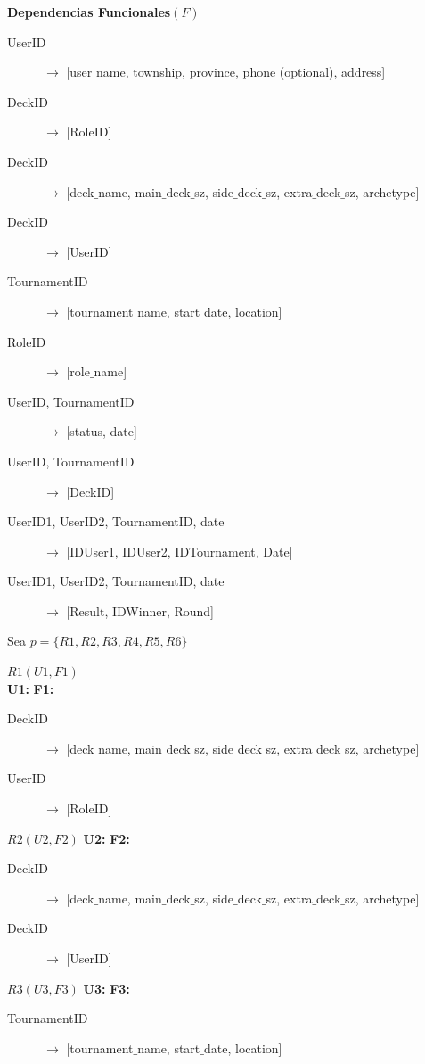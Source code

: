 \documentclass[a4paper]{article}
\begin{document}
\textbf{Dependencias Funcionales}$(F)$
\begin{description}
  \item[UserID] $\rightarrow$ [user$\_$name, township, province, phone (optional), address]
  \item[DeckID] $\rightarrow$ [RoleID]
  \item[DeckID] $\rightarrow$ [deck$\_$name, main$\_$deck$\_$sz, side$\_$deck$\_$sz, extra$\_$deck$\_$sz, archetype]
  \item[DeckID] $\rightarrow$ [UserID]
  \item[TournamentID] $\rightarrow$ [tournament$\_$name, start$\_$date, location]
  \item[RoleID] $\rightarrow$ [role$\_$name]
  \item[UserID, TournamentID] $\rightarrow$ [status, date]
  \item[UserID, TournamentID] $\rightarrow$ [DeckID]
  \item[UserID1, UserID2, TournamentID, date] $\rightarrow$ [IDUser1, IDUser2, IDTournament, Date]
  \item[UserID1, UserID2, TournamentID, date] $\rightarrow$ [Result, IDWinner, Round]
\end{description}

Sea $p = \{R1, R2, R3, R4, R5, R6\}$

$R1(U1,F1)$\\
\textbf{U1:}
\textbf{F1:}
\begin{description}
  \item[DeckID] $\rightarrow$ [deck$\_$name, main$\_$deck$\_$sz, side$\_$deck$\_$sz, extra$\_$deck$\_$sz, archetype]
  \item[UserID] $\rightarrow$ [RoleID]
\end{description}

$R2(U2,F2)$
\textbf{U2:}
\textbf{F2:}
\begin{description}
  \item[DeckID] $\rightarrow$ [deck$\_$name, main$\_$deck$\_$sz, side$\_$deck$\_$sz, extra$\_$deck$\_$sz, archetype]
  \item[DeckID] $\rightarrow$ [UserID]
\end{description}

$R3(U3,F3)$
\textbf{U3:}
\textbf{F3:}
\begin{description}
  \item[TournamentID] $\rightarrow$ [tournament$\_$name, start$\_$date, location]
\end{description}
\end{document}
